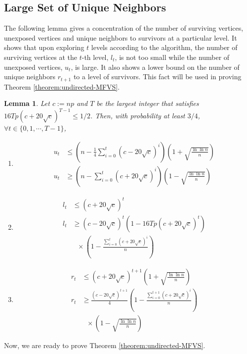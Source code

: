 \documentclass[11pt]{article}
\newtheorem{lemma}[theorem]{Lemma}
\begin{document}
\subsection{Large Set of Unique Neighbors}
The following lemma gives a concentration of the number of surviving vertices, unexposed vertices and unique neighbors to survivors at a particular level. It shows that upon exploring $t$ levels according to the algorithm, the number of surviving vertices at the $t$-th level, $l_t$, is not too small while the number of unexposed vertices, $u_t$, is large. It also shows a lower bound on the number of unique neighbors $r_{t+1}$ to a level of survivors. This fact will be used in proving Theorem \ref{theorem:undirected-MFVS}.
\begin{lemma}\label{lemma:largesurvivors}
Let $c:=np$ and $T$ be the largest integer that satisfies $16Tp(c+20\sqrt{c})^{T-1}\leq 1/2$.
Then, with probability at least $3/4$, $\forall t \in \{0,1,\cdots,T-1\}$,
\begin{enumerate}
\item
\begin{align*}
u_t &\leq \left(n-\frac{1}{4}\sum_{i=0}^t(c-20\sqrt{c})^i \right)\left(1+\sqrt{\frac{\ln{\ln{n}}}{n}}\right) \\
u_t &\geq (n-\sum_{i=0}^t(c+20\sqrt{c})^i)\left(1-\sqrt{\frac{\ln{\ln{n}}}{n}}\right)
\end{align*}
\item
\begin{align*}
l_t &\leq \left(c+20\sqrt{c} \right)^t\\
l_t &\geq \left(c-20\sqrt{c}\right)^t(1-16Tp(c+20\sqrt{c})^t)\\
	& \ \ \ \times \left(1-\frac{\sum_{i=0}^t(c+20\sqrt{c})^i}{n}\right)
\end{align*}
\item
\begin{align*}
r_t &\leq (c+20\sqrt{c})^{t+1}\left(1+\sqrt{\frac{\ln{\ln{n}}}{n}}\right)\\
r_t &\geq \frac{(c-20\sqrt{c})^{t+1}}{4} \left(1-\frac{\sum_{i=0}^{t+1}(c+20\sqrt{c})^i}{n}\right)\\
  & \ \ \ \times \left(1-\sqrt{\frac{\ln{\ln{n}}}{n}}\right)
\end{align*}
\end{enumerate}
\end{lemma}

Now, we are ready to prove Theorem \ref{theorem:undirected-MFVS}.
\end{document}

